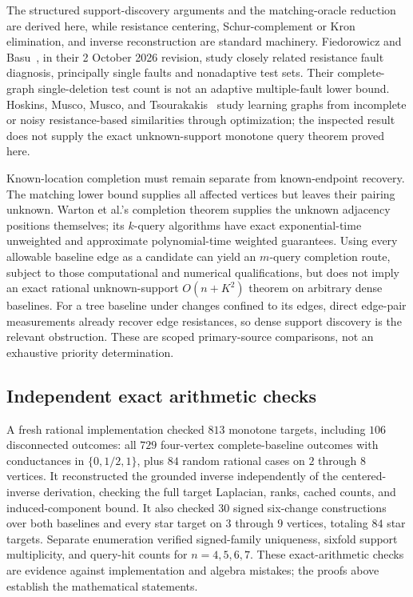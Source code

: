 \documentclass[11pt,letterpaper]{article}
\begin{document}
The structured support-discovery arguments and the matching-oracle reduction are derived here, while resistance centering, Schur-complement or Kron elimination, and inverse reconstruction are standard machinery. Fiedorowicz and Basu~\cite{FB}, in their 2 October 2026 revision, study closely related resistance fault diagnosis, principally single faults and nonadaptive test sets. Their complete-graph single-deletion test count is not an adaptive multiple-fault lower bound. Hoskins, Musco, Musco, and Tsourakakis~\cite{HMMT} study learning graphs from incomplete or noisy resistance-based similarities through optimization; the inspected result does not supply the exact unknown-support monotone query theorem proved here.

Known-location completion must remain separate from known-endpoint recovery. The matching lower bound supplies all affected vertices but leaves their pairing unknown. Warton et al.'s completion theorem supplies the unknown adjacency positions themselves; its $k$-query algorithms have exact exponential-time unweighted and approximate polynomial-time weighted guarantees. Using every allowable baseline edge as a candidate can yield an $m$-query completion route, subject to those computational and numerical qualifications, but does not imply an exact rational unknown-support $O(n+K^2)$ theorem on arbitrary dense baselines. For a tree baseline under changes confined to its edges, direct edge-pair measurements already recover edge resistances, so dense support discovery is the relevant obstruction. These are scoped primary-source comparisons, not an exhaustive priority determination.

\subsection{Independent exact arithmetic checks}
A fresh rational implementation checked $813$ monotone targets, including $106$ disconnected outcomes: all $729$ four-vertex complete-baseline outcomes with conductances in $\{0,1/2,1\}$, plus $84$ random rational cases on $2$ through $8$ vertices. It reconstructed the grounded inverse independently of the centered-inverse derivation, checking the full target Laplacian, ranks, cached counts, and induced-component bound. It also checked $30$ signed six-change constructions over both baselines and every star target on $3$ through $9$ vertices, totaling $84$ star targets. Separate enumeration verified signed-family uniqueness, sixfold support multiplicity, and query-hit counts for $n=4,5,6,7$. These exact-arithmetic checks are evidence against implementation and algebra mistakes; the proofs above establish the mathematical statements.
\end{document}
